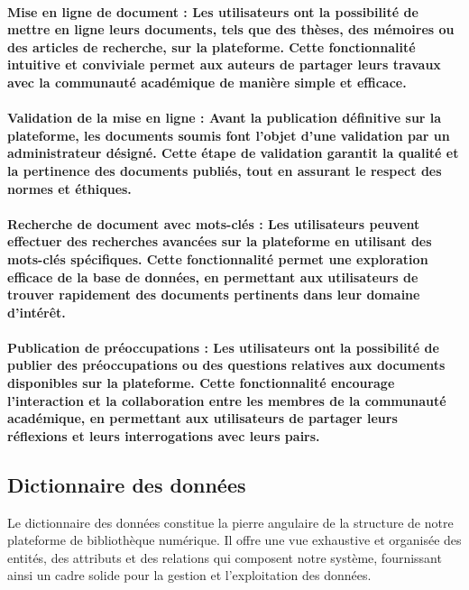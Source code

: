 \paragraph{Mise en ligne de document : Les utilisateurs ont la possibilité de mettre en ligne leurs documents, tels que des thèses, des mémoires ou des articles de recherche, sur la plateforme. Cette fonctionnalité intuitive et conviviale permet aux auteurs de partager leurs travaux avec la communauté académique de manière simple et efficace.}


\paragraph{Validation de la mise en ligne : Avant la publication définitive sur la plateforme, les documents soumis font l'objet d'une validation par un administrateur désigné. Cette étape de validation garantit la qualité et la pertinence des documents publiés, tout en assurant le respect des normes et éthiques.}

\paragraph{Recherche de document avec mots-clés : Les utilisateurs peuvent effectuer des recherches avancées sur la plateforme en utilisant des mots-clés spécifiques. Cette fonctionnalité permet une exploration efficace de la base de données, en permettant aux utilisateurs de trouver rapidement des documents pertinents dans leur domaine d'intérêt.}


\paragraph{
Publication de préoccupations : Les utilisateurs ont la possibilité de publier des préoccupations ou des questions relatives aux documents disponibles sur la plateforme. Cette fonctionnalité encourage l'interaction et la collaboration entre les membres de la communauté académique, en permettant aux utilisateurs de partager leurs réflexions et leurs interrogations avec leurs pairs.}

\subsection{Dictionnaire des données}
Le dictionnaire des données constitue la pierre angulaire de la structure de notre plateforme de bibliothèque numérique. Il offre une vue exhaustive et organisée des entités, des attributs et des relations qui composent notre système, fournissant ainsi un cadre solide pour la gestion et l'exploitation des données.\par

